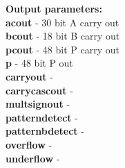             {\bf Output parameters:} \\
            {\bf acout} - 30 bit A carry out   \\
            {\bf bcout} - 18 bit B carry out   \\
            {\bf pcout} - 48 bit P carry out  \\
            {\bf p} - 48 bit P out    \\
            {\bf carryout} -   \\
            {\bf carrycascout} -   \\
            {\bf multsignout} -   \\
            {\bf patterndetect} -   \\
            {\bf patternbdetect} -   \\
            {\bf overflow} -   \\
            {\bf underflow} -   \\

